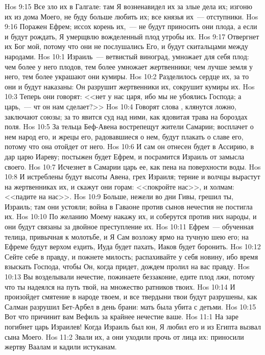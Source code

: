 \vs Hos 9:15 Все зло их в Галгале: там Я возненавидел их за злые дела их; изгоню их из дома Моего, не буду больше любить их; все князья их~--- отступники.
\vs Hos 9:16 Поражен Ефрем; иссох корень их,~--- не будут приносить они плода, а если и будут рождать, Я умерщвлю вожделенный плод утробы их.
\vs Hos 9:17 Отвергнет их Бог мой, потому что они не послушались Его, и будут скитальцами между народами.
\vs Hos 10:1 Израиль~--- ветвистый виноград, умножает для себя плод: чем более у него плодов, тем более умножает жертвенники; чем лучше земля у него, тем более украшают они кумиры.
\vs Hos 10:2 Разделилось сердце их, за то они и будут наказаны: Он разрушит жертвенники их, сокрушит кумиры их.
\vs Hos 10:3 Теперь они говорят: <<нет у нас царя, ибо мы не убоялись Господа; а царь,~--- чт он нам сделает?>>
\vs Hos 10:4 Говорят слова , клянутся ложно, заключают союзы; за то явится суд над ними, как ядовитая трава на бороздах поля.
\vs Hos 10:5 За тельца Беф-Авена вострепещут жители Самарии; восплачет о нем народ его, и жрецы его, радовавшиеся о нем, будут плакать о славе его, потому что она отойдет от него.
\vs Hos 10:6 И сам он отнесен будет в Ассирию, в дар царю Иареву; постыжен будет Ефрем, и посрамится Израиль от замысла своего.
\vs Hos 10:7 Исчезнет в Самарии царь ее, как пена на поверхности воды.
\vs Hos 10:8 И истреблены будут высоты Авена, грех Израиля; терние и волчцы вырастут на жертвенниках их, и скажут они горам: <<покройте нас>>, и холмам: <<падите на нас>>.
\vs Hos 10:9 Больше, нежели во дни Гивы, грешил ты, Израиль; там они устояли; война в Гаваоне против сынов нечестия не постигла их.
\vs Hos 10:10 По желанию Моему накажу их, и соберутся против них народы, и они будут связаны за двойное преступление их.
\vs Hos 10:11 Ефрем~--- обученная телица, привычная к молотьбе, и Я Сам возложу ярмо на тучную шею его; на Ефреме будут верхом ездить, Иуда будет пахать, Иаков будет боронить.
\vs Hos 10:12 Сейте себе в правду, и пожнете милость; распахивайте у себя новину, ибо время взыскать Господа, чтобы Он, когда придет, дождем пролил на вас правду.
\vs Hos 10:13 Вы возделывали нечестие, пожинаете беззаконие, едите плод лжи, потому что ты надеялся на путь твой, на множество ратников твоих.
\vs Hos 10:14 И произойдет смятение в народе твоем, и все твердыни твои будут разрушены, как Салман разрушил Бет-Арбел в день брани: мать была убита с детьми.
\vs Hos 10:15 Вот что причинит вам Вефиль за крайнее нечестие ваше.
\vs Hos 11:1 На заре погибнет царь Израилев! Когда Израиль был юн, Я любил его и из Египта вызвал сына Моего.
\vs Hos 11:2 Звали их, а они уходили прочь от лица их: приносили жертву Ваалам и кадили истуканам.
